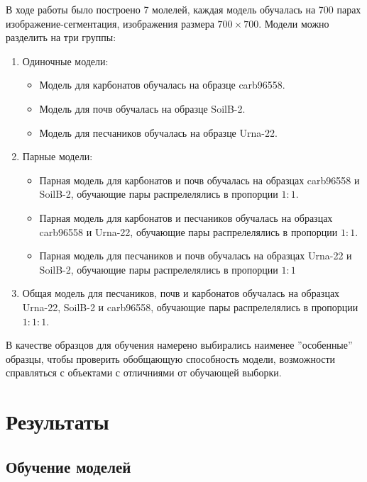 \documentclass[12pt, a4paper]{extarticle}
\begin{document}
В ходе работы было построено 7 молелей, каждая модель обучалась на 700 парах изображение-сегментация, изображения размера $700\times700$. Модели можно разделить на три группы:
\begin{enumerate}
	\item Одиночные модели:
	\begin{itemize}
		\item Модель для карбонатов обучалась на образце carb96558.
	
		\item Модель для почв обучалась на образце SoilB-2.
	
		\item Модель для песчаников обучалась на образце Urna-22.
	\end{itemize}
	
	\item Парные модели:
	\begin{itemize}	
		\item Парная модель для карбонатов и почв обучалась на образцах carb96558 и SoilB-2, обучающие пары распрелелялись в пропорции $1:1$.
	
		\item Парная модель для карбонатов и песчаников обучалась на образцах carb96558 и Urna-22, обучающие пары распрелелялись в пропорции $1:1$.
	
	\item  Парная модель для песчаников и почв обучалась на образцах Urna-22 и SoilB-2, обучающие пары распрелелялись в пропорции $1:1$
	\end{itemize}
	
	\item  Общая модель для песчаников, почв и карбонатов обучалась на образцах Urna-22, SoilB-2 и carb96558, обучающие пары распрелелялись в пропорции $1:1:1$.
	
\end{enumerate}

В качестве образцов для обучения намерено выбирались наименее ''особенные'' образцы, чтобы проверить обобщающую способность модели, возможности справляться с объектами с отличниями от обучающей выборки.


\newpage


\section{Результаты} \label{seg_results}

\subsection{Обучение моделей}
\end{document}
